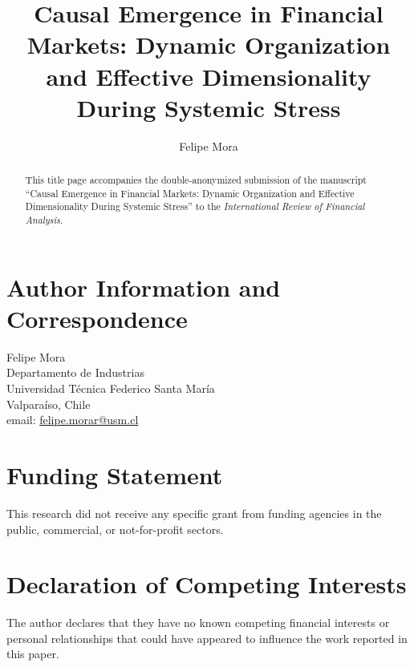 \documentclass[12pt,authoryear]{elsarticle}
\begin{document}
\begin{frontmatter}

\title{Causal Emergence in Financial Markets: Dynamic Organization and Effective Dimensionality During Systemic Stress}

\author[inst1]{Felipe Mora}


\begin{abstract}
This title page accompanies the double-anonymized submission of the manuscript ``Causal Emergence in Financial Markets: Dynamic Organization and Effective Dimensionality During Systemic Stress'' to the \emph{International Review of Financial Analysis}.
\end{abstract}

\end{frontmatter}

\section*{Author Information and Correspondence}
\vspace{5mm}
Felipe Mora \\
Departamento de Industrias \\
Universidad Técnica Federico Santa María \\
Valparaíso, Chile \\
email: \href{mailto:felipe.morar@usm.cl}{felipe.morar@usm.cl}

\section*{Funding Statement}
This research did not receive any specific grant from funding agencies in the public, commercial, or not-for-profit sectors.

\section*{Declaration of Competing Interests}
The author declares that they have no known competing financial interests or personal relationships that could have appeared to influence the work reported in this paper.
\end{document}
